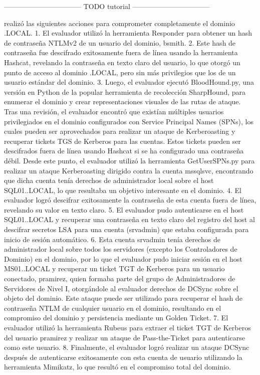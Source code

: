 ---------------------------------
TODO tutorial
---------------------------------

\qquad \brandName realizó las siguientes acciones para comprometer completamente el dominio \enterpriseName.LOCAL.
1. El evaluador utilizó la herramienta Responder para obtener un hash de contraseña NTLMv2 de un usuario del dominio, bsmith.
2. Este hash de contraseña fue descifrado exitosamente fuera de línea usando la herramienta Hashcat, revelando la contraseña en texto claro del usuario, lo que otorgó un punto de acceso al dominio \enterpriseName.LOCAL, pero sin más privilegios que los de un usuario estándar del dominio.
3. Luego, el evaluador ejecutó BloodHound.py, una versión en Python de la popular herramienta de recolección SharpHound, para enumerar el dominio y crear representaciones visuales de las rutas de ataque. Tras una revisión, el evaluador encontró que existían múltiples usuarios privilegiados en el dominio configurados con Service Principal Names (SPNs), los cuales pueden ser aprovechados para realizar un ataque de Kerberoasting y recuperar tickets TGS de Kerberos para las cuentas. Estos tickets pueden ser descifrados fuera de línea usando Hashcat si se ha configurado una contraseña débil. Desde este punto, el evaluador utilizó la herramienta GetUserSPNs.py para realizar un ataque Kerberoasting dirigido contra la cuenta mssqlsvc, encontrando que dicha cuenta tenía derechos de administrador local sobre el host SQL01.\enterpriseName.LOCAL, lo que resultaba un objetivo interesante en el dominio.
4. El evaluador logró descifrar exitosamente la contraseña de esta cuenta fuera de línea, revelando su valor en texto claro.
5. El evaluador pudo autenticarse en el host SQL01.\enterpriseName.LOCAL y recuperar una contraseña en texto claro del registro del host al descifrar secretos LSA para una cuenta (srvadmin) que estaba configurada para inicio de sesión automático.
6. Esta cuenta srvadmin tenía derechos de administrador local sobre todos los servidores (excepto los Controladores de Dominio) en el dominio, por lo que el evaluador pudo iniciar sesión en el host MS01.\enterpriseName.LOCAL y recuperar un ticket TGT de Kerberos para un usuario conectado, pramirez, quien formaba parte del grupo de Administradores de Servidores de Nivel I, otorgándole al evaluador derechos de DCSync sobre el objeto del dominio. Este ataque puede ser utilizado para recuperar el hash de contraseña NTLM de cualquier usuario en el dominio, resultando en el compromiso del dominio y persistencia mediante un Golden Ticket.
7. El evaluador utilizó la herramienta Rubeus para extraer el ticket TGT de Kerberos del usuario pramirez y realizar un ataque de Pass-the-Ticket para autenticarse como este usuario.
8. Finalmente, el evaluador logró realizar un ataque DCSync después de autenticarse exitosamente con esta cuenta de usuario utilizando la herramienta Mimikatz, lo que resultó en el compromiso total del dominio.
